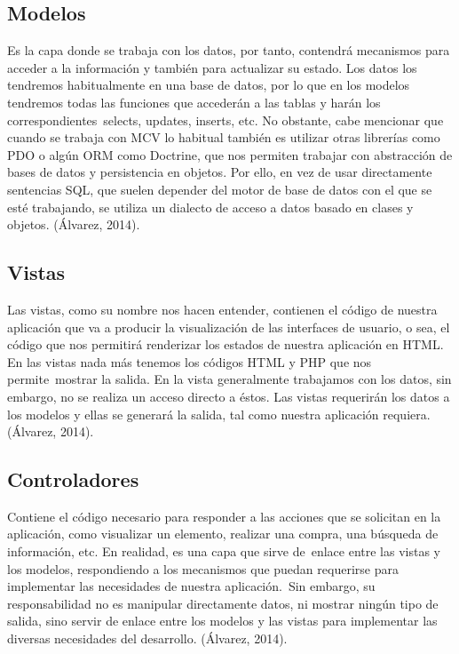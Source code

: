 \subsection{Modelos}

Es la capa donde se trabaja con los datos, por tanto, contendrá mecanismos para acceder a la información y también para actualizar su estado. Los datos los tendremos habitualmente en una base de datos, por lo que en los modelos tendremos todas las funciones que accederán a las tablas y harán los correspondientes selects, updates, inserts, etc.
No obstante, cabe mencionar que cuando se trabaja con MCV lo habitual también es utilizar otras librerías como PDO o algún ORM como Doctrine, que nos permiten trabajar con abstracción de bases de datos y persistencia en objetos. Por ello, en vez de usar directamente sentencias SQL, que suelen depender del motor de base de datos con el que se esté trabajando, se utiliza un dialecto de acceso a datos basado en clases y objetos. (Álvarez, 2014).


\subsection{Vistas}
Las vistas, como su nombre nos hacen entender, contienen el código de nuestra aplicación que va a producir la visualización de las interfaces de usuario, o sea, el código que nos permitirá renderizar los estados de nuestra aplicación en HTML. En las vistas nada más tenemos los códigos HTML y PHP que nos permite mostrar la salida.
En la vista generalmente trabajamos con los datos, sin embargo, no se realiza un acceso directo a éstos. Las vistas requerirán los datos a los modelos y ellas se generará la salida, tal como nuestra aplicación requiera. (Álvarez, 2014).

\subsection{Controladores}
Contiene el código necesario para responder a las acciones que se solicitan en la aplicación, como visualizar un elemento, realizar una compra, una búsqueda de información, etc.
En realidad, es una capa que sirve de enlace entre las vistas y los modelos, respondiendo a los mecanismos que puedan requerirse para implementar las necesidades de nuestra aplicación. Sin embargo, su responsabilidad no es manipular directamente datos, ni mostrar ningún tipo de salida, sino servir de enlace entre los modelos y las vistas para implementar las diversas necesidades del desarrollo. (Álvarez, 2014).




